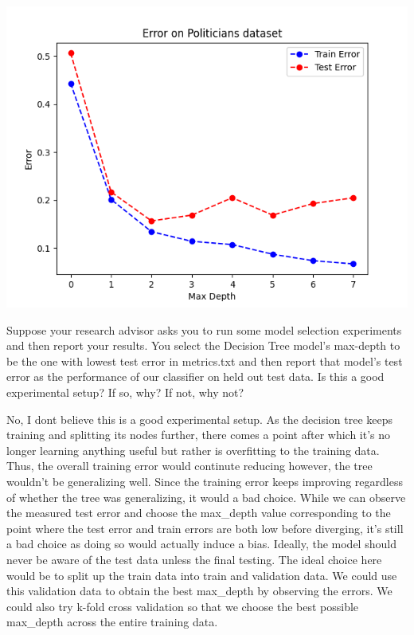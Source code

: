 \documentclass[11pt,addpoints,answers]{exam}
\begin{document}
\begin{questions}
        \begin{your_solution}[title=Plot,height=15cm,width=15cm]
        \begin{center}
        \includegraphics[width=14cm]{../code/plots/ErrorOnPoliticians.png}
        \end{center}
    \end{your_solution}


    \clearpage
    \question[3] Suppose your research advisor asks you to run some model selection experiments and then report your results. You select the Decision Tree model's max-depth to be the one with lowest test error in metrics.txt and then report that model's test error as the performance of our classifier on held out test data. Is this a good experimental setup? If so, why? If not, why not?
    

    

    
    
    \begin{your_solution}[title=Answer,height=7cm,width=15cm]
No, I dont believe this is a good experimental setup. \newline
As the decision tree keeps training and splitting its nodes further, there comes a point after which it's no longer learning anything useful but rather is overfitting to the training data. Thus, the overall training error would continute reducing however, the tree wouldn't be generalizing well. Since the training error keeps improving regardless of whether the tree was generalizing, it would a bad choice. 
While we can observe the measured test error and choose the max\_depth value corresponding to the point where the test error and train errors are both low before diverging, it's still a bad choice as doing so would actually induce a bias. Ideally, the model should never be aware of the test data unless the final testing.\newline
The ideal choice here would be to split up the train data into train and validation data. We could use this validation data to obtain the best max\_depth by observing the errors. We could also try k-fold cross validation so that we choose the best possible max\_depth across the entire training data.    
    \end{your_solution}



\end{questions}
\end{document}
